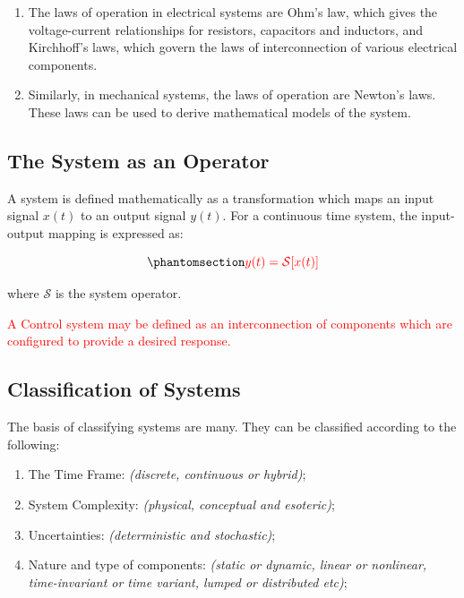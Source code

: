 \documentclass[
  14pt,
  a4paper,
  oneside,
  open=any,
  a4paper,
  14pt]{report}
\begin{document}
\begin{enumerate}
\def\labelenumi{\alph{enumi}.}
\item
  The laws of operation in electrical systems are Ohm's law, which gives
  the voltage-current relationships for resistors, capacitors and
  inductors, and Kirchhoff's laws, which govern the laws of
  interconnection of various electrical components.
\item
  Similarly, in mechanical systems, the laws of operation are Newton's
  laws. These laws can be used to derive mathematical models of the
  system.
\end{enumerate}

\subsection{The System as an Operator}\label{the-system-as-an-operator}

A system is defined mathematically as a transformation which maps an
input signal \(x(t)\) to an output signal \(y(t)\). For a continuous
time system, the input-output mapping is expressed as:

\begin{equation}\phantomsection\label{eq-system-operator}{
    \textcolor{red}{y(t) = \mathcal{S}[x(t)]}
}\end{equation}

where \(\mathcal{S}\) is the system operator.

\textcolor{red}{A Control system may be defined as an interconnection of
components which are configured to provide a desired response.}

\subsection{Classification of Systems}\label{classification-of-systems}

The basis of classifying systems are many. They can be classified
according to the following:

\begin{enumerate}
\def\labelenumi{\alph{enumi}.}
\item
  The Time Frame: \emph{(discrete, continuous or hybrid)};
\item
  System Complexity: \emph{(physical, conceptual and esoteric)};
\item
  Uncertainties: \emph{(deterministic and stochastic)};
\item
  Nature and type of components: \emph{(static or dynamic, linear or
  nonlinear, time-invariant or time variant, lumped or distributed
  etc)};
\end{enumerate}
\end{document}
